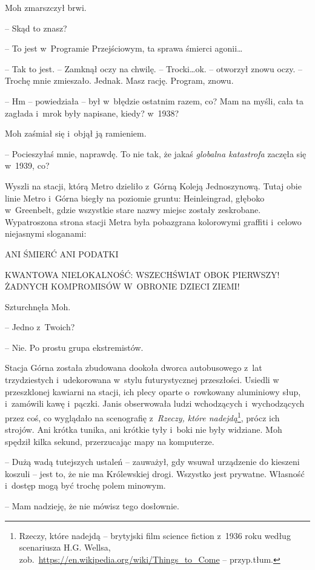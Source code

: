 \documentclass[oneside,polish,11pt,sfheadings]{mwbk}
\begin{document}
Moh zmarszczył brwi. 

-- Skąd to znasz?

-- To jest w~Programie Przejściowym, ta sprawa śmierci agonii\ldots

-- Tak to jest. -- Zamknął oczy na chwilę. -- Trocki\ldots ok. -- otworzył
znowu oczy. -- Trochę mnie zmieszało. Jednak. Masz rację. Program, znowu.

-- Hm -- powiedziała -- był w~błędzie ostatnim razem, co? Mam na myśli,
cała ta zagłada i~mrok były napisane, kiedy? w~1938?

Moh zaśmiał się i~objął ją ramieniem. 

-- Pocieszyłaś mnie, naprawdę. To
nie tak, że jakaś \emph{globalna katastrofa} zaczęła się w~1939, co?

Wyszli na stacji, którą Metro dzieliło z~Górną Koleją Jednoszynową.
Tutaj obie linie Metro i~Górna biegły na poziomie gruntu: Heinleingrad,
głęboko w~Greenbelt, gdzie wszystkie stare nazwy miejsc zostały
zeskrobane. Wypatroszona strona stacji Metra była pobazgrana kolorowymi
graffiti i~celowo niejasnymi sloganami:

ANI ŚMIERĆ ANI PODATKI

KWANTOWA NIELOKALNOŚĆ: WSZECHŚWIAT OBOK PIERWSZY! ŻADNYCH KOMPROMISÓW W~OBRONIE DZIECI ZIEMI!

Szturchnęła Moh. 

-- Jedno z~Twoich?

-- Nie. Po prostu grupa ekstremistów.

Stacja Górna została zbudowana dookoła dworca autobusowego z~lat
trzydziestych i~udekorowana w~stylu futurystycznej przeszłości. Usiedli
w przeszklonej kawiarni na stacji, ich plecy oparte o~rowkowany
aluminiowy słup, i~zamówili kawę i~pączki. Janis obserwowała ludzi
wchodzących i~wychodzących przez coś, co wyglądało na scenografię z~\emph{Rzeczy, które nadejdą}\footnote{Rzeczy, które
nadejdą -- brytyjski film science fiction z~1936 roku według scenariusza
H.G. Wellsa,
zob.~\url{https://en.wikipedia.org/wiki/Things\_to\_Come} -- przyp.tłum.}, prócz ich strojów.  Ani krótka tunika, ani krótkie tyły i~boki nie były
widziane. Moh spędził kilka sekund, przerzucając mapy na komputerze.

-- Dużą wadą tutejszych ustaleń -- zauważył, gdy wsuwał urządzenie do
kieszeni koszuli -- jest to, że nie ma Królewskiej drogi. Wszystko jest
prywatne. Własność i~dostęp mogą być trochę polem minowym.

-- Mam nadzieję, że nie mówisz tego dosłownie.
\end{document}
